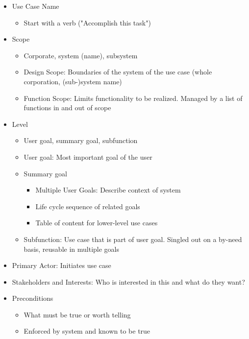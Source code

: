 \documentclass[
../../Software_Engineering_Summary.tex,
]
{subfiles}
\begin{document}
\begin{defbox}
    \begin{itemize}
        \item Use Case Name
        \begin{itemize}
            \item Start with a verb ("Accomplish this task")
        \end{itemize}
        \item Scope
        \begin{itemize}
            \item Corporate, system (name), subsystem
            \item Design Scope: Boundaries of the system of the use case (whole corporation, (sub-)system name)
            \item Function Scope: Limits functionality to be realized. Managed by a list of functions in and out of scope
        \end{itemize}
        \item Level
        \begin{itemize}
            \item User goal, summary goal, subfunction
            \item User goal: Most important goal of the user
            \item Summary goal
            \begin{itemize}
                \item Multiple User Goals: Describe context of system
                \item Life cycle sequence of related goals
                \item Table of content for lower-level use cases
            \end{itemize}
            \item Subfunction: Use case that is part of user goal. Singled out on a by-need basis, reusable in multiple goals
        \end{itemize}
        \item Primary Actor: Initiates use case
        \item Stakeholders and Interests: Who is interested in this and what do they want?
        \item Preconditions
        \begin{itemize}
            \item What must be true or worth telling
            \item Enforced by system and known to be true

\end{itemize}
\end{itemize}
\end{defbox}
\end{document}
